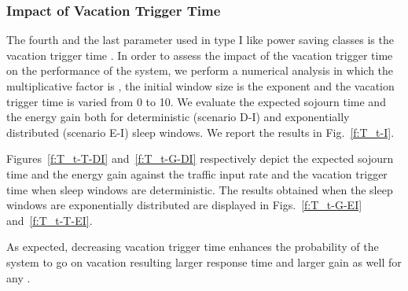 \documentclass[journal]{IEEEtran}
\begin{document}
\subsubsection{Impact of Vacation Trigger Time }
\label{s:T_t}
The fourth and the last parameter used in type I like power saving classes
is the vacation trigger time . In order to assess the impact of the vacation trigger time on the performance of the system, we perform a numerical analysis in which the multiplicative factor is , the initial window size is  the exponent  and the vacation trigger time is varied from 0 to 10. We evaluate the expected sojourn time  and the energy gain  both for deterministic (scenario D-I) and exponentially distributed (scenario E-I) sleep windows. We report the results in Fig.~\ref{f:T_t-I}.
\begin{figure*}[tb]
\begin{center}
\caption{Impact of  on  and  with either deterministic or exponential .
\label{f:T_t-I}}
\end{center}
\end{figure*}
Figures~\ref{f:T_t-T-DI} and~\ref{f:T_t-G-DI} respectively depict the expected sojourn time  and the energy gain  against the traffic input rate  and the vacation trigger time  when sleep windows are deterministic. The results obtained when the sleep windows are exponentially distributed are displayed in Figs.~\ref{f:T_t-G-EI} and~\ref{f:T_t-T-EI}.

As expected, decreasing vacation trigger time enhances the probability of the system to go on vacation resulting larger response time  and larger gain  as well for any .
\end{document}

